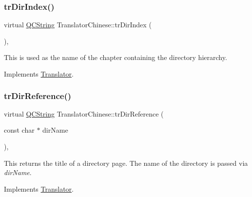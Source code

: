\mbox{\label{class_translator_chinese_a2ec4e8582f096292cd5c4314612bf84c}} 
\subsubsection{\texorpdfstring{trDirIndex()}{trDirIndex()}}
{\footnotesize\ttfamily virtual \mbox{\hyperlink{class_q_c_string}{Q\+C\+String}} Translator\+Chinese\+::tr\+Dir\+Index (\begin{DoxyParamCaption}{ }\end{DoxyParamCaption})\hspace{0.3cm}{\ttfamily [inline]}, {\ttfamily [virtual]}}

This is used as the name of the chapter containing the directory hierarchy. 

Implements \mbox{\hyperlink{class_translator}{Translator}}.

\mbox{\label{class_translator_chinese_a082ced768e3f45b78bcff1f1e14c918f}} 
\subsubsection{\texorpdfstring{trDirReference()}{trDirReference()}}
{\footnotesize\ttfamily virtual \mbox{\hyperlink{class_q_c_string}{Q\+C\+String}} Translator\+Chinese\+::tr\+Dir\+Reference (\begin{DoxyParamCaption}\item[{const char $\ast$}]{dir\+Name }\end{DoxyParamCaption})\hspace{0.3cm}{\ttfamily [inline]}, {\ttfamily [virtual]}}

This returns the title of a directory page. The name of the directory is passed via {\itshape dir\+Name}. 

Implements \mbox{\hyperlink{class_translator}{Translator}}.

\mbox{\label{class_translator_chinese_aa01255ece3b24f857760bd23e37b2d93}} 
